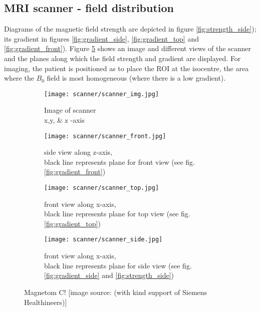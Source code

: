 \subsection{MRI scanner - field distribution}
\label{sec:magnetom}

Diagrams of the magnetic field strength are depicted in figure \ref{fig:strength_side}); its gradient in figures \ref{fig:gradient_side}, \ref{fig:gradient_top} and \ref{fig:gradient_front}).
Figure \ref{fig:scanner} shows an image and different views of the scanner and the planes along which the field strength and gradient are displayed.
For imaging, the patient is positioned as to place the ROI at the isocentre, the area where the $B_0$ field is most homogeneous (where there is a low gradient).

\begin{figure}[!htb]
\centering
  \begin{subfigure}[b]{0.4\textwidth}
	\centering
	\texttt{[image: scanner/scanner\_img.jpg]}
	\caption{Image of scanner\\ x,y, \& z -axis}
	\label{fig:scanner_image}
  \end{subfigure}
    \hfill
  \begin{subfigure}[b]{0.4\textwidth}
  	\centering
    \texttt{[image: scanner/scanner\_front.jpg]}
    \caption{side view along z-axis,\\ black line represents plane for front view (see fig. \ref{fig:gradient_front})}
    \label{fig:scanner_front}
  \end{subfigure}
  
  \begin{subfigure}[b]{0.4\textwidth}
   	\centering
   	\texttt{[image: scanner/scanner\_top.jpg]}
   	\caption{front view along x-axis,\\ black line represents plane for top view (see fig. \ref{fig:gradient_top})}
   	\label{fig:scanner_top}
  \end{subfigure}
    \hfill
  \begin{subfigure}[b]{0.4\textwidth}
  	\centering
  	\texttt{[image: scanner/scanner\_side.jpg]}
  	\caption{front view along x-axis,\\ black line represents plane for side view (see fig. \ref{fig:gradient_side} and \ref{fig:strength_side})}
  	\label{fig:scanner_side}
  \end{subfigure}
  \caption{Magnetom C! [image source: \cite{magnetom_handbook} (with kind support of Siemens Healthineers)]}
  \label{fig:scanner}
\end{figure}

